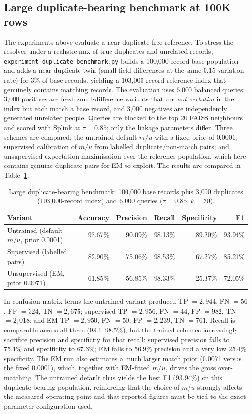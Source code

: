 \documentclass[conference]{IEEEtran}
\begin{document}
\subsection{Large duplicate-bearing benchmark at 100K rows}
The experiments above evaluate a near-duplicate-free reference. To stress the resolver under a realistic mix of true duplicates and unrelated records, \texttt{experiment\_duplicate\_benchmark.py} builds a 100{,}000-record base population and adds a near-duplicate twin (small field differences at the same 0.15 variation rate) for 3\% of base records, yielding a 103{,}000-record reference index that genuinely contains matching records. The evaluation uses 6{,}000 balanced queries: 3{,}000 positives are fresh small-difference variants that are \emph{not verbatim} in the index but each match a base record, and 3{,}000 negatives are independently generated unrelated people. Queries are blocked to the top 20 FAISS neighbours and scored with Splink at $\tau=0.85$; only the linkage parameters differ. Three schemes are compared: the untrained default $m/u$ with a fixed prior of $0.0001$; supervised calibration of $m/u$ from labelled duplicate/non-match pairs; and unsupervised expectation maximisation over the reference population, which here contains genuine duplicate pairs for EM to exploit. The results are compared in Table~\ref{tab:100k-benchmark}.

\begin{table}[t]
\centering
\caption{Large duplicate-bearing benchmark: 100{,}000 base records plus 3{,}000 duplicates (103{,}000-record index) and 6{,}000 queries ($\tau=0.85$, $k=20$).}
\label{tab:100k-benchmark}
\begin{tabular}{lrrrrr}
\toprule
Variant & Accuracy & Precision & Recall & Specificity & F1 \\
\midrule
Untrained (default $m/u$, prior 0.0001) & 93.67\% & 90.09\% & 98.13\% & 89.20\% & 93.94\% \\
Supervised (labelled pairs) & 82.90\% & 75.06\% & 98.53\% & 67.27\% & 85.21\% \\
Unsupervised (EM, prior 0.0071) & 61.85\% & 56.85\% & 98.33\% & 25.37\% & 72.05\% \\
\bottomrule
\end{tabular}
\end{table}

In confusion-matrix terms the untrained variant produced TP \(=2{,}944\), FN \(=56\), FP \(=324\), TN \(=2{,}676\); supervised TP \(=2{,}956\), FN \(=44\), FP \(=982\), TN \(=2{,}018\); and EM TP \(=2{,}950\), FN \(=50\), FP \(=2{,}239\), TN \(=761\). Recall is comparable across all three (98.1--98.5\%), but the trained schemes increasingly sacrifice precision and specificity for that recall: supervised precision falls to 75.1\% and specificity to 67.3\%; EM falls to 56.9\% precision and a very low 25.4\% specificity. The EM run also estimates a much larger match prior (0.0071 versus the fixed 0.0001), which, together with EM-fitted $m/u$, drives the gross over-matching. The untrained default thus yields the best F1 (93.94\%) on this duplicate-bearing population, reinforcing that the choice of $m/u$ strongly affects the measured operating point and that reported figures must be tied to the exact parameter configuration used.
\end{document}

